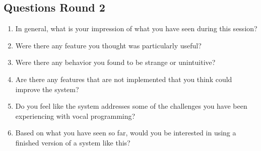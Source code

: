 \begin{appendices}
\section{Questions Round 2}
\begin{enumerate}[label*=Q2.\arabic*]
    \item In general, what is your impression of what you have seen during this session?
    \item Were there any feature you thought was particularly useful?
    \item Were there any behavior you found to be strange or unintuitive?
    \item Are there any features that are not implemented that you think could improve the system?
    \item Do you feel like the system addresses some of the challenges you have been experiencing with vocal programming?
    \item Based on what you have seen so far, would you be interested in using a finished version of a system like this?
\end{enumerate}


\end{appendices}
